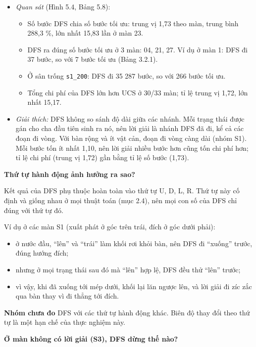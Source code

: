 \begin{itemize}
\tightlist
\item
  \emph{Quan sát} (Hình 5.4, Bảng 5.8):

  \begin{itemize}
  \tightlist
  \item
    Số bước DFS chia số bước tối ưu: trung vị 1,73 theo màn, trung bình 288,3 \%, lớn nhất 15,83 lần ở màn 23.
  \item
    DFS ra đúng số bước tối ưu ở 3 màn: 04, 21, 27. Ví dụ ở màn 1: DFS đi 37 bước, so với 7 bước tối ưu (Bảng 3.2.1).
  \item
    Ở sân trống \texttt{s1\_\allowbreak{}200}: DFS đi 35 287 bước, so với 266 bước tối ưu.
  \item
    Tổng chi phí của DFS lớn hơn UCS ở 30/33 màn; tỉ lệ trung vị 1,72, lớn nhất 15,17.
  \end{itemize}
\item
  \emph{Giải thích:} DFS không so sánh độ dài giữa các nhánh. Mỗi trạng thái được gán cho cha đầu tiên sinh ra nó, nên lời giải là nhánh DFS đã đi, kể cả các đoạn đi vòng. Với bàn rộng và ít vật cản, đoạn đi vòng càng dài (nhóm S1). Mỗi bước tốn ít nhất 1,10, nên lời giải nhiều bước hơn cũng tốn chi phí hơn; tỉ lệ chi phí (trung vị 1,72) gần bằng tỉ lệ số bước (1,73).
\end{itemize}

\textbf{Thứ tự hành động ảnh hưởng ra sao?}

Kết quả của DFS phụ thuộc hoàn toàn vào thứ tự U, D, L, R. Thứ tự này cố định và giống nhau ở mọi thuật toán (mục 2.4), nên mọi con số của DFS chỉ đúng với thứ tự đó.

Ví dụ ở các màn S1 (xuất phát ở góc trên trái, đích ở góc dưới phải):

\begin{itemize}
\tightlist
\item
  ở nước đầu, ``lên'' và ``trái'' làm khối rơi khỏi bàn, nên DFS đi ``xuống'' trước, đúng hướng đích;
\item
  nhưng ở mọi trạng thái sau đó mà ``lên'' hợp lệ, DFS đều thử ``lên'' trước;
\item
  vì vậy, khi đã xuống tới mép dưới, khối lại lăn ngược lên, và lời giải đi zíc zắc qua bàn thay vì đi thẳng tới đích.
\end{itemize}

\textbf{Nhóm chưa đo} DFS với các thứ tự hành động khác. Biên độ thay đổi theo thứ tự là một hạn chế của thực nghiệm này.

\textbf{Ở màn không có lời giải (S3), DFS dừng thế nào?}

